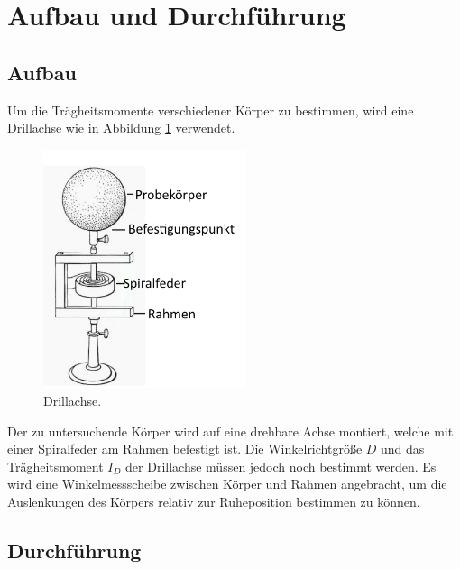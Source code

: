 \section{Aufbau und Durchführung}
\label{sec:Durchführung}
\subsection{Aufbau}
Um die Trägheitsmomente verschiedener Körper zu bestimmen, wird eine Drillachse wie in Abbildung \ref{df:1} verwendet.

\begin{figure}
  \centering
  \includegraphics[height=7cm]{Aufbau.png}
  \caption{Drillachse.\cite{sample}}
  \label{df:1}
\end{figure}

Der zu untersuchende Körper wird auf eine drehbare Achse montiert, welche mit einer Spiralfeder am Rahmen befestigt ist.
Die Winkelrichtgröße $D$ und das Trägheitsmoment $I_{D}$ der Drillachse müssen jedoch noch bestimmt werden.
Es wird eine Winkelmessscheibe zwischen Körper und Rahmen angebracht, um die Auslenkungen des Körpers relativ zur Ruheposition bestimmen zu können.

\subsection{Durchführung}


